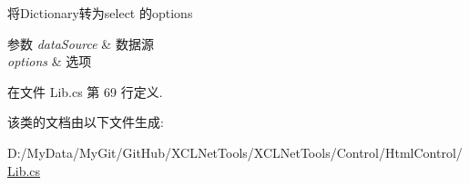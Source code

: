 将\-Dictionary转为select 的options 


\begin{DoxyParams}{参数}
{\em data\-Source} & 数据源\\
\hline
{\em options} & 选项\\
\hline
\end{DoxyParams}


在文件 Lib.\-cs 第 69 行定义.



该类的文档由以下文件生成\-:\begin{DoxyCompactItemize}
\item 
D\-:/\-My\-Data/\-My\-Git/\-Git\-Hub/\-X\-C\-L\-Net\-Tools/\-X\-C\-L\-Net\-Tools/\-Control/\-Html\-Control/\hyperlink{_control_2_html_control_2_lib_8cs}{Lib.\-cs}\end{DoxyCompactItemize}
